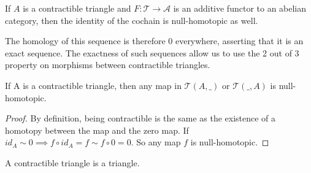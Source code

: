     \begin{remark}
        If $A$ is a contractible triangle and $F:\mathcal{T}\rightarrow \mathcal{A}$ is an additive functor to an abelian category, then the identity of the cochain is null-homotopic as well.
        \begin{center}
        \end{center}
        The homology of this sequence is therefore $0$ everywhere, asserting that it is an exact sequence.
        The exactness of such sequences allow us to use the 2 out of 3 property on morphisms between contractible triangles.
    \end{remark}

    \begin{corollary}
        If A is a contractible triangle, then any map in $\mathcal{T}(A,\_)$ or $\mathcal{T}(\_,A)$ is null-homotopic.
    \end{corollary}

    \begin{proof}
        By definition, being contractible is the same as the existence of a homotopy between the map and the zero map. If $id_A\sim 0 \implies f\circ id_A = f \sim f\circ 0 = 0$. So any map $f$ is null-homotopic.
    \end{proof}

    \begin{lemma}
        A contractible triangle is a triangle.
    \end{lemma}

